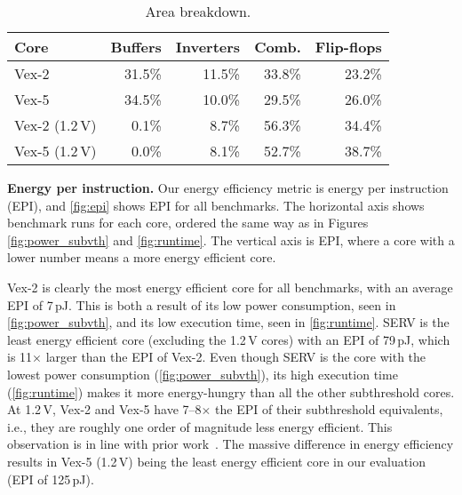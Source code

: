 \begin{table}[tp]
  \centering
  \caption{Area breakdown.}
  \begin{tabular}{l|r|r|r|r}
    Core         & Buffers & Inverters & Comb.  & Flip-flops   \\
    \hline
    \hline
    Vex-2        & 31.5\%  & 11.5\%    & 33.8\% & 23.2\% \\
    Vex-5        & 34.5\%  & 10.0\%    & 29.5\% & 26.0\% \\
    \hline
    Vex-2 (1.2\,V) &  0.1\%  &  8.7\%    & 56.3\% & 34.4\% \\
    Vex-5 (1.2\,V) &  0.0\%  &  8.1\%    & 52.7\% & 38.7\% \\
  \end{tabular}
  \label{tab:area}
\end{table}

\noindent
\textbf{Energy per instruction.}
Our energy efficiency metric is energy per instruction (EPI), and \autoref{fig:epi} shows EPI for all benchmarks.  The horizontal axis shows benchmark runs for each core, ordered the same way as in Figures \ref{fig:power_subvth} and \ref{fig:runtime}.  The vertical axis is EPI, where a core with a lower number means a more energy efficient core.

Vex-2 is clearly the most energy efficient core for all benchmarks, with an average EPI of 7\,pJ.  This is both a result of its low power consumption, seen in \autoref{fig:power_subvth}, and its low execution time, seen in \autoref{fig:runtime}.  SERV is the least energy efficient core (excluding the 1.2\,V cores) with an EPI of 79\,pJ, which is 11$\times$ larger than the EPI of Vex-2.  Even though SERV is the core with the lowest power consumption (\autoref{fig:power_subvth}), its high execution time (\autoref{fig:runtime}) makes it more energy-hungry than all the other subthreshold cores. 
At 1.2\,V, Vex-2 and Vex-5 have 7--8$\times$ the EPI of their subthreshold equivalents, i.e., they are roughly one order of magnitude less energy efficient. This observation is in line with prior work~\cite{6359800,Beiu}. The massive difference in energy efficiency results in Vex-5 (1.2\,V) being the least energy efficient core in our evaluation (EPI of 125\,pJ).



